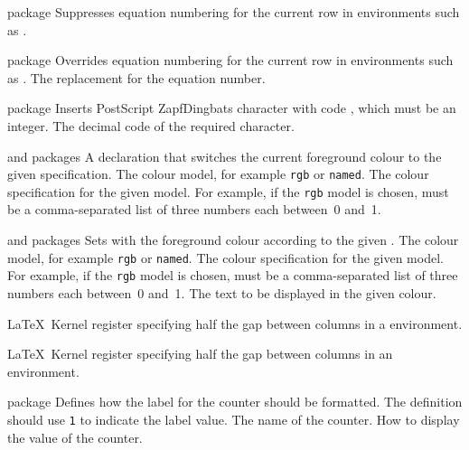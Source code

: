 %
 {}%
 { package}%
 {Suppresses equation numbering for the current row in environments such as
   .}%
 {}

%
 {}%
 { package}%
 {Overrides equation numbering for the current row in environments such as
   .}%
 {%
    \BeginArgList
      The replacement for the equation number.
    \EndArgList
 }

%
 {}%
 { package}%
 {Inserts PostScript ZapfDingbats character with code ,
   which must be an integer.}%
 {%
   \BeginArgList
     The decimal code of the required character.
   \EndArgList
 }

%
 {}%
 { and  packages}%
 {A declaration that switches the current foreground colour to the given specification.}%
 {%
    \BeginArgList
       The colour model, for example
      \texttt{rgb} or \texttt{named}.
       The colour specification for the
      given model. For example, if the \texttt{rgb} model is chosen,
       must be a comma-separated list of three numbers
      each between~0 and~1.
    \EndArgList
 }

%
 {}%
 { and  packages}%
 {Sets  with the foreground colour according to the given .}%
 {%
    \BeginArgList
       The colour model, for example
      \texttt{rgb} or \texttt{named}.
       The colour specification for the
      given model. For example, if the \texttt{rgb} model is chosen,
       must be a comma-separated list of three numbers
      each between~0 and~1.
       The text to be displayed in the
      given colour.
    \EndArgList
 }

 {}%
 {\LaTeX\ Kernel}%
 { register specifying half the gap between
   columns in a  environment.}%
 {}

 {}%
 {\LaTeX\ Kernel}%
 { register specifying half the gap between
   columns in an  environment.}%
 {}


%
 {}%
 { package}%
 {Defines how the label for the counter  should be
 formatted. The definition  should use \texttt{1} to
 indicate the label value.}%
 {%
   \BeginArgList
      The name of the counter.
      How to display the value of the counter.
   \EndArgList
 }

